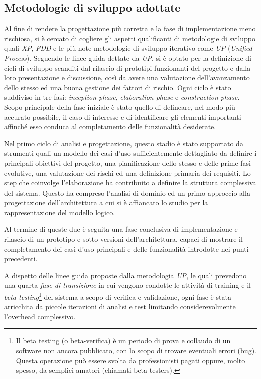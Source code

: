 \subsection{Metodologie di sviluppo adottate}
Al fine di rendere la progettazione più corretta e la fase di implementazione meno rischiosa, si è cercato di cogliere gli aspetti qualificanti di metodologie di sviluppo quali \textit{XP}, \textit{FDD} e le più note metodologie di sviluppo iterativo come \textit{UP} (\emph{Unified Process}).
Seguendo le linee guida dettate da \textit{UP}, si è optato per la definizione di cicli di sviluppo scanditi dal rilascio di prototipi funzionanti del progetto e dalla loro presentazione e discussione, così da avere una valutazione dell'avanzamento dello stesso ed una buona gestione dei fattori di rischio. Ogni ciclo è stato suddiviso in tre fasi: \textit{inception phase}, \textit{elaboration phase} e \textit{construction phase}.
Scopo principale della fase iniziale è stato quello di delineare, nel modo più accurato possibile, il caso di interesse e di identificare gli elementi importanti affinché esso conduca al completamento delle funzionalità desiderate.

Nel primo ciclo di analisi e progettazione, questo stadio è stato supportato da strumenti quali un modello dei casi d'uso sufficientemente dettagliato da definire i principali obiettivi del progetto, una pianificazione dello stesso e delle prime fasi evolutive, una valutazione dei rischi ed una definizione primaria dei requisiti.
Lo step che coinvolge l'elaborazione ha contribuito a definire la struttura complessiva del sistema. Questo ha compreso l'analisi di dominio ed un primo approccio alla progettazione dell'architettura a cui si è affiancato lo studio per la rappresentazione del modello logico.

Al termine di queste due è seguita una fase conclusiva di implementazione e rilascio di un prototipo e sotto-versioni dell'architettura, capaci di mostrare il completamento dei casi d'uso principali e delle funzionalità introdotte nei punti precedenti.

A dispetto delle linee guida proposte dalla metodologia \emph{UP}, le quali prevedono una quarta \textit{fase di transizione} in cui vengono condotte le attività di training e il \textit{beta testing}\footnote{Il beta testing (o beta-verifica) è un periodo di prova e collaudo di un software non ancora pubblicato, con lo scopo di trovare eventuali errori (bug). Questa operazione può essere svolta da professionisti pagati oppure, molto spesso, da semplici amatori (chiamati beta-testers).} del sistema a scopo di verifica e validazione, ogni fase è stata arricchita da piccole iterazioni di analisi e test limitando considerevolmente l'overhead complessivo.

